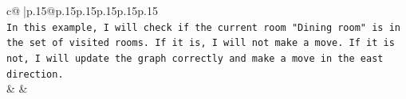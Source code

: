 \documentclass{article}
\begin{document}
{\begin{supertabular}{c@{$\;$}|p{.15\linewidth}@{}p{.15\linewidth}p{.15\linewidth}p{.15\linewidth}p{.15\linewidth}p{.15\linewidth}}
{{{\\ 
\texttt{In this example, I will check if the current room "Dining room" is in the set of visited rooms. If it is, I will not make a move. If it is not, I will update the graph correctly and make a move in the east direction.} \\
            }
        }
    }
    & & \\ \\

\end{supertabular}
}
\end{document}
